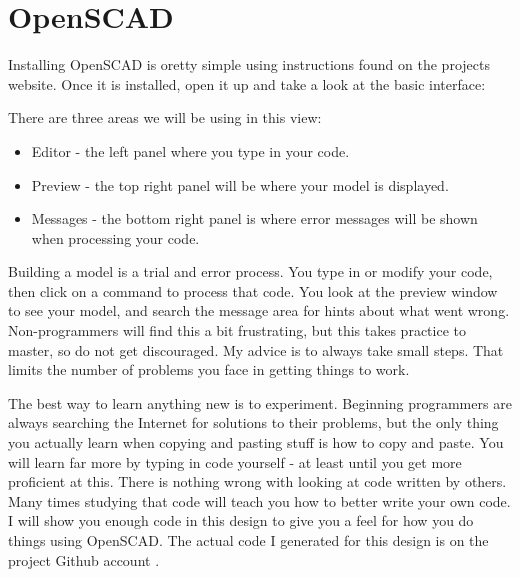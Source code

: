 \section*{OpenSCAD}

Installing OpenSCAD is oretty simple using instructions found on the projects
website. Once it is installed, open it up and take a look at the basic
interface:


There are three areas we will be using in this view:

\begin{itemize}
\item{Editor - the left panel where you type in your code.}
\item{Preview - the top right panel will be where your model is displayed.}
\item{Messages - the bottom right panel is where error messages will be shown
when processing your code.} 
\end{itemize}

Building a model is a trial and error process. You type in or modify your code,
then click on a command to process that code. You look at the preview window to
see your model, and search the message area for hints about what went wrong.
Non-programmers will find this a bit frustrating, but this takes practice to
master, so do not get discouraged. My advice is to always take small steps.
That limits the number of problems you face in getting things to work.

The best way to learn anything new is to experiment. Beginning programmers are
always searching the Internet for solutions to their problems, but the only
thing you actually learn when copying and pasting stuff is how to copy and
paste. You will learn far more by typing in code yourself - at least until you
get more proficient at this. There is nothing wrong with looking at code
written by others. Many times studying that code will teach you how to better
write your own code. I will show you enough code in this design to give you a feel
for how you do things using OpenSCAD. The actual code I generated for this
design is on the project Github account \cite{blackr}.
